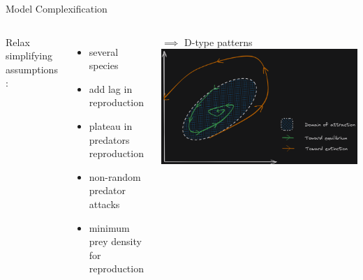 \documentclass[11,aspectratio=1610]{beamer}
\begin{document}
\begin{frame}{Model Complexification}



\begin{footnotesize}

 \begin{columns}
             Relax simplifying assumptions :

\vspace{0.2cm}
\begin{itemize}
  \item several species
\item  add lag in reproduction 
\item  plateau in predators reproduction
\item  non-random predator attacks 
\item  minimum prey density for reproduction 
\end{itemize}


$\implies$ D-type patterns \\
\vspace{1cm}
\includegraphics[width=\textwidth]{img/type2D.png}
\vfill
\end{columns}

\end{footnotesize}

\end{frame}
\end{document}
